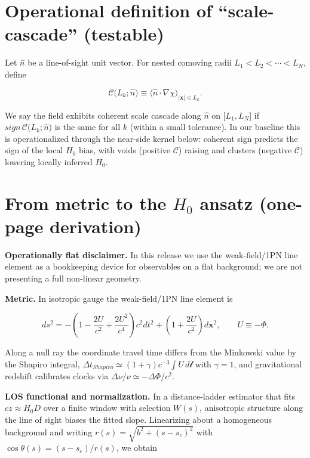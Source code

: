 \documentclass[
]{article}
\begin{document}
\section{Operational definition of ``scale-cascade''
(testable)}\label{operational-definition-of-scale-cascade-testable}

Let \(\widehat{n}\) be a line-of-sight unit vector. For nested comoving
radii \(L_{1} < L_{2} < \cdots < L_{N}\), define

\[\mathcal{C(}L_{k};\widehat{n}) \equiv \langle\widehat{n} \cdot \nabla\chi\rangle_{|\mathbf{x}| \leq L_{k}}.\]

We say the field exhibits coherent scale cascade along \(\widehat{n}\)
on \(\lbrack L_{1},L_{N}\rbrack\) if
\(sign\,\mathcal{C(}L_{k};\widehat{n})\) is the same for all \(k\)
(within a small tolerance). In our baseline this is operationalized
through the near-side kernel below: coherent sign predicts the sign of
the local \(H_{0}\) bias, with voids (positive \(\mathcal{C}\)) raising
and clusters (negative \(\mathcal{C}\)) lowering locally inferred
\(H_{0}\).

\section{\texorpdfstring{From metric to the \(H_{0}\) ansatz (one-page
derivation)}{From metric to the H\_\{0\} ansatz (one-page derivation)}}\label{from-metric-to-the-h_0-ansatz-one-page-derivation}

\textbf{Operationally flat disclaimer.} In this release we use the
weak-field/1PN line element as a bookkeeping device for observables on a
flat background; we are not presenting a full non-linear geometry.

\textbf{Metric.} In isotropic gauge the weak-field/1PN line element is

\[ds^{2} = - \left( 1 - \frac{2U}{c^{2}} + \frac{2U^{2}}{c^{4}} \right)c^{2}dt^{2} + \left( 1 + \frac{2U}{c^{2}} \right)d\mathbf{x}^{2},\quad\quad U \equiv - \Phi.\]

Along a null ray the coordinate travel time differs from the Minkowski
value by the Shapiro integral,
\(\Delta t_{Shapiro} \simeq (1 + \gamma)c^{- 3}\int U\, d\mathcal{l}\)
with \(\gamma = 1\), and gravitational redshift calibrates clocks via
\(\Delta\nu/\nu \simeq - \Delta\Phi/c^{2}\).

\textbf{LOS functional and normalization.} In a distance-ladder
estimator that fits \(cz \approx H_{0}D\) over a finite window with
selection \(W(s)\), anisotropic structure along the line of sight biases
the fitted slope. Linearizing about a homogeneous background and writing
\(r(s) = \sqrt{b^{2} + (s - s_{c})^{2}}\) with
\(\cos\theta(s) = (s - s_{c})/r(s)\), we obtain
\end{document}
